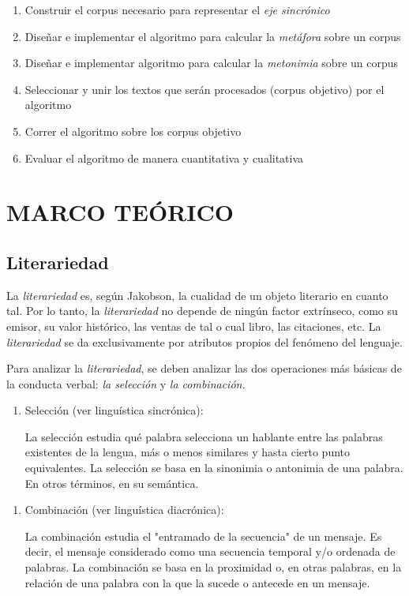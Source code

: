 \documentclass[twoside]{article}
\begin{document}
\begin{enumerate}
\item Construir el corpus necesario para representar el \emph{eje sincrónico}
\item Diseñar e implementar el algoritmo para calcular la \emph{metáfora} sobre un corpus
\item Diseñar e implementar algoritmo para calcular la \emph{metonimia} sobre un corpus
\item Seleccionar y unir los textos que serán procesados (corpus objetivo) por el algoritmo
\item Correr el algoritmo sobre los corpus objetivo
\item Evaluar el algoritmo de manera cuantitativa y cualitativa
\end{enumerate}

\section{MARCO TEÓRICO}
\label{sec:org81f895f}

\subsection{Literariedad}
\label{sec:orge960469}


La \emph{literariedad} es, según Jakobson, la cualidad de un objeto
literario en cuanto tal. Por lo tanto, la \emph{literariedad} no depende de
ningún factor extrínseco, como su emisor, su valor histórico, las
ventas de tal o cual libro, las citaciones, etc. La \emph{literariedad} se
da exclusivamente por atributos propios del fenómeno del lenguaje.

Para analizar la \emph{literariedad}, se deben analizar las dos operaciones
más básicas de la conducta verbal: \emph{la selección} y \emph{la combinación.}


\begin{enumerate}
\item Selección (ver linguística sincrónica):

La selección estudia qué palabra selecciona un hablante entre las
palabras existentes de la lengua, más o menos similares y hasta
cierto punto equivalentes. La selección se basa en la sinonimia o
antonimia de una palabra. En otros términos, en su semántica.
\end{enumerate}



\begin{enumerate}
\item Combinación (ver linguística diacrónica):

La combinación estudia el "entramado de la secuencia" de un
mensaje. Es decir, el mensaje considerado como una secuencia
temporal y/o ordenada de palabras. La combinación se basa en la
proximidad o, en otras palabras, en la relación de una palabra con
la que la sucede o antecede en un mensaje.
\end{enumerate}
\end{document}
